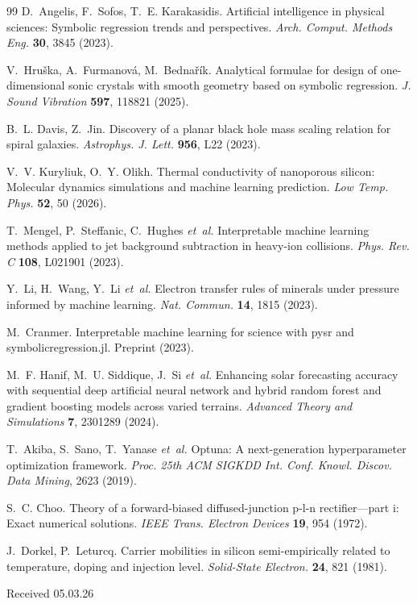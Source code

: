 \documentclass[fleqn,twoside,twocolumn,nofootinbib,showkeys]{revtex4} %
\begin{document}
\begin{thebibliography}{99}
D.~Angelis, F.~Sofos, T.~E. Karakasidis. Artificial intelligence in physical sciences: Symbolic regression trends and perspectives. \textit{Arch. Comput. Methods Eng.} \textbf{30}, 3845 (2023).

V.~Hruška, A.~Furmanová, M.~Bednařík. Analytical formulae for design of one-dimensional sonic crystals with smooth geometry based on symbolic regression. \textit{J. Sound Vibration} \textbf{597}, 118821 (2025).

B.~L. Davis, Z.~Jin. Discovery of a planar black hole mass scaling relation for spiral galaxies. \textit{Astrophys. J. Lett.} \textbf{956}, L22 (2023).

V.~V. Kuryliuk, O.~Y. Olikh. Thermal conductivity of nanoporous silicon: Molecular dynamics simulations and machine learning prediction. \textit{Low Temp. Phys.} \textbf{52}, 50 (2026).

T.~Mengel, P.~Steffanic, C.~Hughes \textit{et~al.} Interpretable machine learning methods applied to jet background subtraction in heavy-ion collisions. \textit{Phys. Rev. C} \textbf{108}, L021901 (2023).

Y.~Li, H.~Wang, Y.~Li \textit{et~al.} Electron transfer rules of minerals under pressure informed by machine learning. \textit{Nat. Commun.} \textbf{14}, 1815 (2023).

M.~Cranmer. Interpretable machine learning for science with pysr and symbolicregression.jl. Preprint (2023).

M.~F. Hanif, M.~U. Siddique, J.~Si \textit{et~al.} Enhancing solar forecasting accuracy with sequential deep artificial neural network and hybrid random forest and gradient boosting models across varied terrains. \textit{Advanced Theory and Simulations} \textbf{7}, 2301289 (2024).

T.~Akiba, S.~Sano, T.~Yanase \textit{et~al.} Optuna: A next-generation hyperparameter optimization framework. \textit{Proc. 25th ACM SIGKDD Int. Conf. Knowl. Discov. Data Mining}, 2623 (2019).

S.~C. Choo. Theory of a forward-biased diffused-junction p-l-n rectifier—part i: Exact numerical solutions. \textit{IEEE Trans. Electron Devices} \textbf{19}, 954 (1972).

J.~Dorkel, P.~Leturcq. Carrier mobilities in silicon semi-empirically related to temperature, doping and injection level. \textit{Solid-State Electron.} \textbf{24}, 821 (1981).

\begin{flushright}
{\footnotesize Received 05.03.26}
\end{flushright}
\end{thebibliography}
\end{document}
